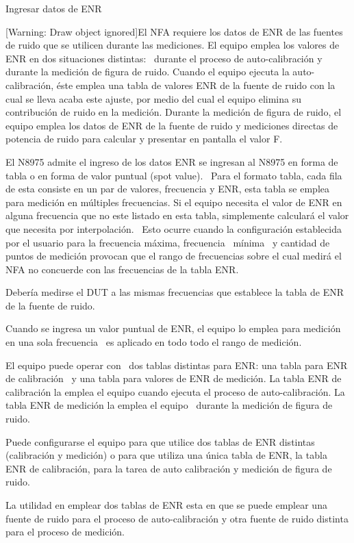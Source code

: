 {	Ingresar datos de ENR
	
	[Warning: Draw object ignored]El NFA requiere los datos de ENR de las fuentes de ruido que se utilicen durante las
	mediciones. El equipo emplea los valores de ENR en dos situaciones distintas: \ durante el proceso de auto-calibración
	y durante la medición de figura de ruido. Cuando el equipo ejecuta la auto-calibración, éste emplea una tabla de
	valores ENR de la fuente de ruido con la cual se lleva acaba este ajuste, por medio del cual el equipo elimina su
	contribución de ruido en la medición. Durante la medición de figura de ruido, el equipo emplea los datos de ENR de la
	fuente de ruido y mediciones directas de potencia de ruido para calcular y presentar en pantalla el valor F. 
	
	El N8975 admite el ingreso de los datos ENR se ingresan al N8975 en forma de tabla o en forma de valor puntual (spot
	value). \ Para el formato tabla, cada fila de esta consiste en un par de valores, frecuencia y ENR, esta tabla se
	emplea para medición en múltiples frecuencias. Si el equipo necesita el valor de ENR en alguna frecuencia que no este
	listado en esta tabla, simplemente calculará el valor que necesita por interpolación. \ Esto ocurre cuando la
	configuración establecida por el usuario para la frecuencia máxima, frecuencia \ mínima \ y cantidad de puntos de
	medición provocan que el rango de frecuencias sobre el cual medirá el NFA no concuerde con las frecuencias de la tabla
	ENR. 
	
	Debería medirse el DUT a las mismas frecuencias que establece la tabla de ENR de la fuente de ruido.
	
	Cuando se ingresa un valor puntual de ENR, el equipo lo emplea para medición en una sola frecuencia \ es aplicado en
	todo todo el rango de medición.
	
	El equipo puede operar con \ dos tablas distintas para ENR: una tabla para ENR de calibración \ y una tabla para valores
	de ENR de medición. La tabla ENR de calibración la emplea el equipo cuando ejecuta el proceso de auto-calibración. La
	tabla ENR de medición la emplea el equipo \ durante la medición de figura de ruido. \ 
	
	Puede configurarse el equipo para que utilice dos tablas de ENR distintas (calibración y medición) o para que utiliza
	una única tabla de ENR, la tabla ENR de calibración, para la tarea de auto calibración y medición de figura de ruido.
	
	La utilidad en emplear dos tablas de ENR esta en que se puede emplear una fuente de ruido para el proceso de
	auto-calibración y otra fuente de ruido distinta para el proceso de medición. 
	
}
